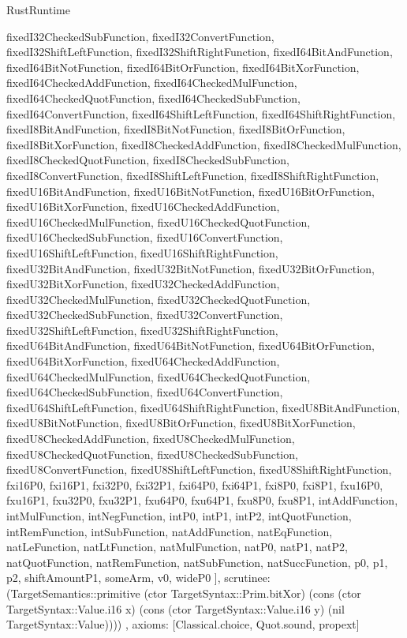 \begin{lexlean}{RustRuntime}
\begin{semanticmodule}
{{      fixedI32CheckedSubFunction,
      fixedI32ConvertFunction,
      fixedI32ShiftLeftFunction,
      fixedI32ShiftRightFunction,
      fixedI64BitAndFunction,
      fixedI64BitNotFunction,
      fixedI64BitOrFunction,
      fixedI64BitXorFunction,
      fixedI64CheckedAddFunction,
      fixedI64CheckedMulFunction,
      fixedI64CheckedQuotFunction,
      fixedI64CheckedSubFunction,
      fixedI64ConvertFunction,
      fixedI64ShiftLeftFunction,
      fixedI64ShiftRightFunction,
      fixedI8BitAndFunction,
      fixedI8BitNotFunction,
      fixedI8BitOrFunction,
      fixedI8BitXorFunction,
      fixedI8CheckedAddFunction,
      fixedI8CheckedMulFunction,
      fixedI8CheckedQuotFunction,
      fixedI8CheckedSubFunction,
      fixedI8ConvertFunction,
      fixedI8ShiftLeftFunction,
      fixedI8ShiftRightFunction,
      fixedU16BitAndFunction,
      fixedU16BitNotFunction,
      fixedU16BitOrFunction,
      fixedU16BitXorFunction,
      fixedU16CheckedAddFunction,
      fixedU16CheckedMulFunction,
      fixedU16CheckedQuotFunction,
      fixedU16CheckedSubFunction,
      fixedU16ConvertFunction,
      fixedU16ShiftLeftFunction,
      fixedU16ShiftRightFunction,
      fixedU32BitAndFunction,
      fixedU32BitNotFunction,
      fixedU32BitOrFunction,
      fixedU32BitXorFunction,
      fixedU32CheckedAddFunction,
      fixedU32CheckedMulFunction,
      fixedU32CheckedQuotFunction,
      fixedU32CheckedSubFunction,
      fixedU32ConvertFunction,
      fixedU32ShiftLeftFunction,
      fixedU32ShiftRightFunction,
      fixedU64BitAndFunction,
      fixedU64BitNotFunction,
      fixedU64BitOrFunction,
      fixedU64BitXorFunction,
      fixedU64CheckedAddFunction,
      fixedU64CheckedMulFunction,
      fixedU64CheckedQuotFunction,
      fixedU64CheckedSubFunction,
      fixedU64ConvertFunction,
      fixedU64ShiftLeftFunction,
      fixedU64ShiftRightFunction,
      fixedU8BitAndFunction,
      fixedU8BitNotFunction,
      fixedU8BitOrFunction,
      fixedU8BitXorFunction,
      fixedU8CheckedAddFunction,
      fixedU8CheckedMulFunction,
      fixedU8CheckedQuotFunction,
      fixedU8CheckedSubFunction,
      fixedU8ConvertFunction,
      fixedU8ShiftLeftFunction,
      fixedU8ShiftRightFunction,
      fxi16P0,
      fxi16P1,
      fxi32P0,
      fxi32P1,
      fxi64P0,
      fxi64P1,
      fxi8P0,
      fxi8P1,
      fxu16P0,
      fxu16P1,
      fxu32P0,
      fxu32P1,
      fxu64P0,
      fxu64P1,
      fxu8P0,
      fxu8P1,
      intAddFunction,
      intMulFunction,
      intNegFunction,
      intP0,
      intP1,
      intP2,
      intQuotFunction,
      intRemFunction,
      intSubFunction,
      natAddFunction,
      natEqFunction,
      natLeFunction,
      natLtFunction,
      natMulFunction,
      natP0,
      natP1,
      natP2,
      natQuotFunction,
      natRemFunction,
      natSubFunction,
      natSuccFunction,
      p0,
      p1,
      p2,
      shiftAmountP1,
      someArm,
      v0,
      wideP0
    ],
    scrutinee: (TargetSemantics::primitive (ctor TargetSyntax::Prim.bitXor) (cons (ctor TargetSyntax::Value.i16 x) (cons (ctor TargetSyntax::Value.i16 y) (nil TargetSyntax::Value))))
  },
  axioms: [Classical.choice, Quot.sound, propext]
}


\end{semanticmodule}
\end{lexlean}
